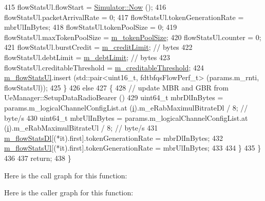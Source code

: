 \begin{DoxyCode}
415           flowStatsUl.flowStart = \hyperlink{classns3_1_1Simulator_ac3178fa975b419f7875e7105be122800}{Simulator::Now} ();
416           flowStatsUl.packetArrivalRate = 0;
417           flowStatsUl.tokenGenerationRate = mbrUlInBytes;
418           flowStatsUl.tokenPoolSize = 0;
419           flowStatsUl.maxTokenPoolSize = \hyperlink{classns3_1_1FdTbfqFfMacScheduler_a0f729f9c65abdbcd28f36269f501fe14}{m\_tokenPoolSize};
420           flowStatsUl.counter = 0;
421           flowStatsUl.burstCredit = \hyperlink{classns3_1_1FdTbfqFfMacScheduler_aa390b2d541c6190fd44f6457fe006a38}{m\_creditLimit};  \textcolor{comment}{// bytes}
422           flowStatsUl.debtLimit = \hyperlink{classns3_1_1FdTbfqFfMacScheduler_aa73b1800df86289d9a1fc49886c9a175}{m\_debtLimit};  \textcolor{comment}{// bytes}
423           flowStatsUl.creditableThreshold = \hyperlink{classns3_1_1FdTbfqFfMacScheduler_a581771a634fa44e3e817131accd9db1f}{m\_creditableThreshold};
424           \hyperlink{classns3_1_1FdTbfqFfMacScheduler_a104df6ff96dc70c7daeffa99ca042f96}{m\_flowStatsUl}.insert (std::pair<uint16\_t, fdtbfqsFlowPerf\_t> (params.m\_rnti, 
      flowStatsUl));
425         \}
426       \textcolor{keywordflow}{else}
427         \{
428           \textcolor{comment}{// update MBR and GBR from UeManager::SetupDataRadioBearer ()}
429           uint64\_t mbrDlInBytes = params.m\_logicalChannelConfigList.at (\hyperlink{bernuolliDistribution_8m_a6f6ccfcf58b31cb6412107d9d5281426}{i}).m\_eRabMaximulBitrateDl / 8;   \textcolor{comment}{
      // byte/s}
430           uint64\_t mbrUlInBytes = params.m\_logicalChannelConfigList.at (\hyperlink{bernuolliDistribution_8m_a6f6ccfcf58b31cb6412107d9d5281426}{i}).m\_eRabMaximulBitrateUl / 8;   \textcolor{comment}{
      // byte/s}
431           \hyperlink{classns3_1_1FdTbfqFfMacScheduler_ad55ff3305031aa6d2b3d351145754972}{m\_flowStatsDl}[(*it).first].tokenGenerationRate =  mbrDlInBytes;
432           \hyperlink{classns3_1_1FdTbfqFfMacScheduler_a104df6ff96dc70c7daeffa99ca042f96}{m\_flowStatsUl}[(*it).first].tokenGenerationRate =  mbrUlInBytes;
433 
434         \}
435     \}
436 
437   \textcolor{keywordflow}{return};
438 \}
\end{DoxyCode}


Here is the call graph for this function\+:




Here is the caller graph for this function\+:


